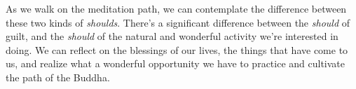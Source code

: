 As we walk on the meditation path, we can contemplate the difference 
between these two kinds of \emph{shoulds}. There's a significant 
difference between the \emph{should} of guilt, and the \emph{should} of 
the natural and wonderful activity we're interested in doing. We can 
reflect on the blessings of our lives, the things that have come to us, 
and realize what a wonderful opportunity we have to practice and 
cultivate the path of the Buddha.

